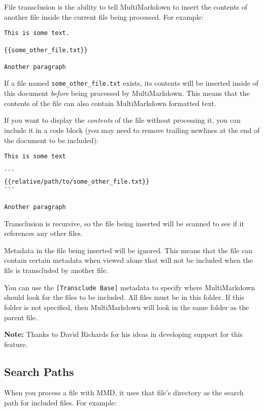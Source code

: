 File transclusion is the ability to tell MultiMarkdown to insert the contents of another file inside the current file being processed. For example:

\begin{verbatim}
This is some text.

{{some_other_file.txt}}

Another paragraph
\end{verbatim}

If a file named \texttt{some\_other\_file.txt} exists, its contents will be inserted inside of this document \emph{before} being processed by MultiMarkdown. This means that the contents of the file can also contain MultiMarkdown formatted text.

If you want to display the \emph{contents} of the file without processing it, you can include it in a code block (you may need to remove trailing newlines at the end of the document to be included):

\begin{verbatim}
This is some text

```
{{relative/path/to/some_other_file.txt}}
```

Another paragraph
\end{verbatim}

Transclusion is recursive, so the file being inserted will be scanned to see if it references any other files.

Metadata in the file being inserted will be ignored. This means that the file can contain certain metadata when viewed alone that will not be included when the file is transcluded by another file.

You can use the \texttt{[Transclude Base]} metadata to specify where MultiMarkdown should look for the files to be included. All files must be in this folder. If this folder is not specified, then MultiMarkdown will look in the same folder as the parent file.

\textbf{Note:} Thanks to David Richards for his ideas in developing support for this feature.

\subsection{Search Paths}
\label{searchpaths}

When you process a file with \gls{MMD}, it uses that file's directory as the search
path for included files. For example:

